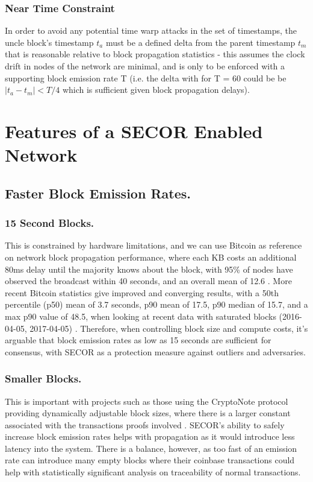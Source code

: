 \documentclass{article}
\begin{document}
\subsubsection{Near Time Constraint}
In order to avoid any potential time warp attacks in the set of timestamps, the uncle block's timestamp $t_a$ must be a defined delta from the parent timestamp $t_m$ that is reasonable relative to block propagation statistics - this assumes the clock drift in nodes of the network are minimal, and is only to be enforced with a supporting block emission rate T (i.e. the delta with for T = 60 could be be $\vert t_a - t_m \vert < T/4$ which is sufficient given block propagation delays).
\section{Features of a SECOR Enabled Network}
\subsection{Faster Block Emission Rates.}
\subsubsection{15 Second Blocks.}
This is constrained by hardware limitations, and we can use Bitcoin as reference on network block propagation performance, where each KB costs an additional 80ms delay until the majority knows about the block, with 95\% of nodes have observed the broadcast within 40 seconds, and an overall mean of 12.6 \cite{decker}. More recent Bitcoin statistics give improved and converging results, with a 50th percentile (p50) mean of 3.7 seconds, p90 mean of 17.5, p90 median of 15.7, and a max p90 value of 48.5, when looking at recent data with saturated blocks (2016-04-05, 2017-04-05) \cite{bitcoinstats}. Therefore, when controlling block size and compute costs, it's arguable that block emission rates as low as 15 seconds are sufficient for consensus, with SECOR as a protection measure against outliers and adversaries.
\subsubsection{Smaller Blocks.}
This is important with projects such as those using the CryptoNote protocol providing dynamically adjustable block sizes, where there is a larger constant associated with the transactions proofs involved \cite{saberhagen}. SECOR's ability to safely increase block emission rates helps with propagation as it would introduce less latency into the system. There is a balance, however, as too fast of an emission rate can introduce many empty blocks where their coinbase transactions could help with statistically significant analysis on traceability of normal transactions.
\end{document}
